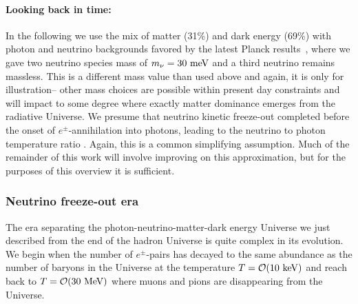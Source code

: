 \paragraph{Looking back in time:}
In the following we use the mix of matter (31\%) and dark energy (69\%) with photon and neutrino backgrounds favored by the latest Planck results~\cite{Planck:2018vyg,Planck:2015fie,Planck:2013pxb}, where we gave two neutrino species mass of $m_\nu=30\text{ meV}$ and a third neutrino remains massless. This is a different mass value than used above and again, it is only for illustration-- other mass choices are possible within present day constraints and will impact to some degree where exactly matter dominance emerges from the radiative Universe. We presume that neutrino kinetic freeze-out completed before the onset of $e^\pm$-annihilation into photons, leading to the neutrino to photon temperature ratio . Again, this is a common simplifying assumption. Much of the remainder of this work will involve improving on this approximation, but for the purposes of this overview it is sufficient.

\subsubsection{Neutrino freeze-out era} \label{nudecoup}
The era separating the photon-neutrino-matter-dark energy Universe we just described from the end of the hadron Universe is quite complex in its evolution. We begin when the number of $e^\pm$-pairs has decayed to the same abundance as the number of baryons in the Universe at the temperature $T=\mathcal{O}(10\text{ keV})$ and reach back to $T={\cal O}(30\MeV)$ where muons and pions are disappearing from the Universe.

